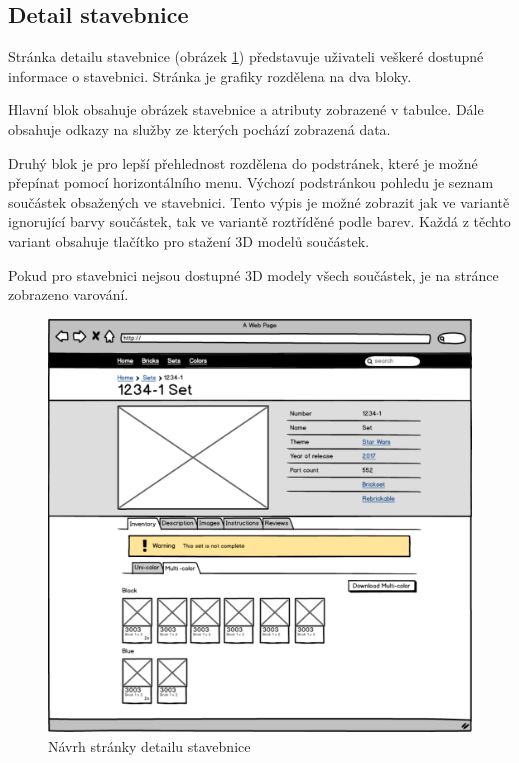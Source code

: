 \subsection{Detail stavebnice}
Stránka detailu stavebnice (obrázek \ref{wireframe-stavebnice-detail}) představuje uživateli veškeré dostupné informace o stavebnici. Stránka je grafiky rozdělena na dva bloky. 

Hlavní blok obsahuje obrázek stavebnice a atributy zobrazené v tabulce. Dále obsahuje odkazy na služby ze kterých pochází zobrazená data.

Druhý blok je pro lepší přehlednost rozdělena do podstránek, které je možné přepínat pomocí horizontálního menu. Výchozí podstránkou pohledu je seznam součástek obsažených ve stavebnici. Tento výpis je možné zobrazit jak ve variantě ignorující barvy součástek, tak ve variantě roztříděné podle barev. Každá z těchto variant obsahuje tlačítko pro stažení 3D modelů součástek.

Pokud pro stavebnici nejsou dostupné 3D modely všech součástek, je na stránce zobrazeno varování. 

\begin{figure}[htbp]
    \centering
    \includegraphics[width=\textwidth,height=\textheight,keepaspectratio]{pdfs/wireframe_set.pdf}
    \caption{Návrh stránky detailu stavebnice}\label{wireframe-stavebnice-detail}
\end{figure}


